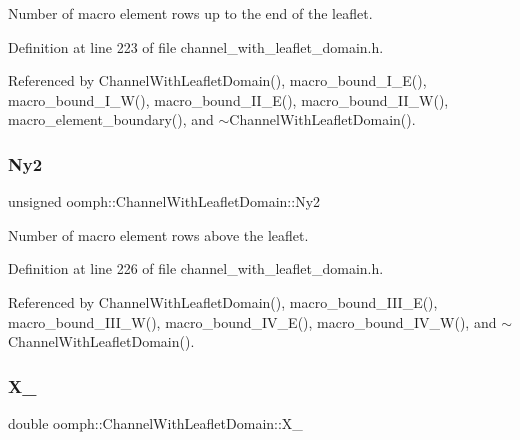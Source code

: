 Number of macro element rows up to the end of the leaflet. 



Definition at line 223 of file channel\+\_\+with\+\_\+leaflet\+\_\+domain.\+h.



Referenced by Channel\+With\+Leaflet\+Domain(), macro\+\_\+bound\+\_\+\+I\+\_\+\+E(), macro\+\_\+bound\+\_\+\+I\+\_\+\+W(), macro\+\_\+bound\+\_\+\+I\+I\+\_\+\+E(), macro\+\_\+bound\+\_\+\+I\+I\+\_\+\+W(), macro\+\_\+element\+\_\+boundary(), and $\sim$\+Channel\+With\+Leaflet\+Domain().

\mbox{\label{classoomph_1_1ChannelWithLeafletDomain_a1596a538b4263b42d20f9c098c5f2752}} 
\subsubsection{\texorpdfstring{Ny2}{Ny2}}
{\footnotesize\ttfamily unsigned oomph\+::\+Channel\+With\+Leaflet\+Domain\+::\+Ny2\hspace{0.3cm}{\ttfamily [protected]}}



Number of macro element rows above the leaflet. 



Definition at line 226 of file channel\+\_\+with\+\_\+leaflet\+\_\+domain.\+h.



Referenced by Channel\+With\+Leaflet\+Domain(), macro\+\_\+bound\+\_\+\+I\+I\+I\+\_\+\+E(), macro\+\_\+bound\+\_\+\+I\+I\+I\+\_\+\+W(), macro\+\_\+bound\+\_\+\+I\+V\+\_\+\+E(), macro\+\_\+bound\+\_\+\+I\+V\+\_\+\+W(), and $\sim$\+Channel\+With\+Leaflet\+Domain().

\mbox{\label{classoomph_1_1ChannelWithLeafletDomain_a165703af81538c28bbbd780d65bbb333}} 
\subsubsection{\texorpdfstring{X\+\_}{X\_0}}
{\footnotesize\ttfamily double oomph\+::\+Channel\+With\+Leaflet\+Domain\+::\+X\+\_\hspace{0.3cm}{\ttfamily [protected]}}



